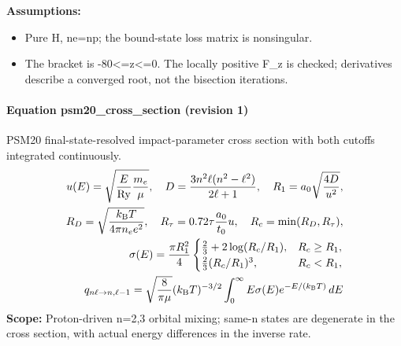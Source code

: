 \noindent\textbf{Assumptions:}
\begin{itemize}
\item Pure H, ne=np; the bound-state loss matrix is nonsingular.
\item The bracket is -80<=z<=0. The locally positive F\_z is checked; derivatives describe a converged root, not the bisection iterations.
\end{itemize}

\paragraph{Equation psm20\_cross\_section (revision 1)}
PSM20 final-state-resolved impact-parameter cross section with both cutoffs integrated continuously.
\begin{equation}
\begin{aligned}
u(E)=\sqrt{\frac{E}{\mathrm{Ry}}\frac{m_e}{\mu}},\quad
D=\frac{3n^2\ell(n^2-\ell^2)}{2\ell+1},\quad R_1=a_0\sqrt{\frac{4D}{u^2}},\\
R_D=\sqrt{\frac{k_{\rm B}T}{4\pi n_e e^2}},\quad
R_\tau=0.72\tau\frac{a_0}{t_0}u,\quad R_c=\min(R_D,R_\tau),\\
\sigma(E)=\frac{\pi R_1^2}{4}\begin{cases}
\frac23+2\log(R_c/R_1),&R_c\ge R_1,\\
\frac23(R_c/R_1)^3,&R_c<R_1,
\end{cases}\\
q_{n\ell\to n,\ell-1}=\sqrt{\frac{8}{\pi\mu}}(k_{\rm B}T)^{-3/2}
\int_0^\infty E\sigma(E)e^{-E/(k_{\rm B}T)}\,dE
\end{aligned}
\label{eq:escape.cloudy_5f_investigation:psm20_5f_cross_5f_section:1}
\end{equation}
\noindent\textbf{Scope:} Proton-driven n=2,3 orbital mixing; same-n states are degenerate in the cross section, with actual energy differences in the inverse rate.

